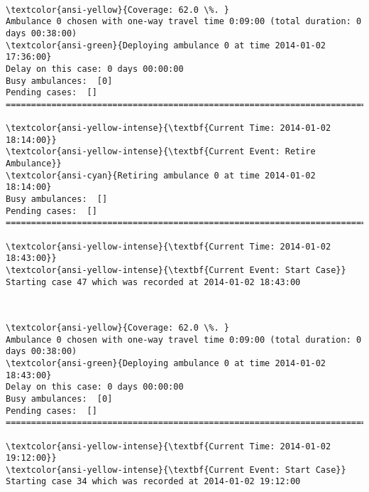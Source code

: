\documentclass[11pt]{article}
\begin{document}
    \begin{center}
    \end{center}
    { \hspace*{\fill} \\}
    
    \begin{Verbatim}[commandchars=\\\{\}]
\textcolor{ansi-yellow}{Coverage: 62.0 \%. }
Ambulance 0 chosen with one-way travel time 0:09:00 (total duration: 0 days 00:38:00)
\textcolor{ansi-green}{Deploying ambulance 0 at time 2014-01-02 17:36:00}
Delay on this case: 0 days 00:00:00
Busy ambulances:  [0]
Pending cases:  []
========================================================================

\textcolor{ansi-yellow-intense}{\textbf{Current Time: 2014-01-02 18:14:00}}
\textcolor{ansi-yellow-intense}{\textbf{Current Event: Retire Ambulance}}
\textcolor{ansi-cyan}{Retiring ambulance 0 at time 2014-01-02 18:14:00}
Busy ambulances:  []
Pending cases:  []
========================================================================

\textcolor{ansi-yellow-intense}{\textbf{Current Time: 2014-01-02 18:43:00}}
\textcolor{ansi-yellow-intense}{\textbf{Current Event: Start Case}}
Starting case 47 which was recorded at 2014-01-02 18:43:00

    \end{Verbatim}

    \begin{center}
    \end{center}
    { \hspace*{\fill} \\}
    
    \begin{Verbatim}[commandchars=\\\{\}]
\textcolor{ansi-yellow}{Coverage: 62.0 \%. }
Ambulance 0 chosen with one-way travel time 0:09:00 (total duration: 0 days 00:38:00)
\textcolor{ansi-green}{Deploying ambulance 0 at time 2014-01-02 18:43:00}
Delay on this case: 0 days 00:00:00
Busy ambulances:  [0]
Pending cases:  []
========================================================================

\textcolor{ansi-yellow-intense}{\textbf{Current Time: 2014-01-02 19:12:00}}
\textcolor{ansi-yellow-intense}{\textbf{Current Event: Start Case}}
Starting case 34 which was recorded at 2014-01-02 19:12:00

    \end{Verbatim}
\end{document}
